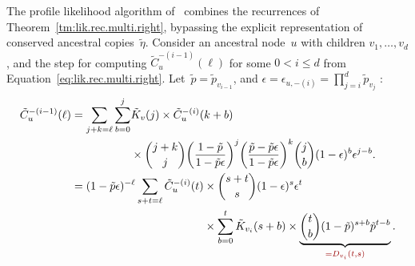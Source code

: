 \documentclass{elsarticle}
\newcommand{\CB}[1]{\textcolor{webbrown}{#1}}
\newcommand{\nlik}{C}
\newcommand{\slik}{K}
\newcommand{\nx}{u}
\newcommand{\ny}{v}
\begin{document}
The profile likelihood algorithm of~\cite{phylobd.archaea,Count}  
combines the recurrences
of Theorem~\ref{tm:lik.rec.multi.right}, 
bypassing the explicit representation 
of conserved ancestral copies~$\tilde{\eta}$. 
Consider an ancestral node~$\nx$ with children $\ny_1,\dotsc, \ny_d$, 
and the step for computing $\tilde{\nlik}^{-(i-1)}_{\nx}(\ell)$ 
for some $0<i\le d$
from Equation~\eqref{eq:lik.rec.multi.right}.
Let~$\tilde{p}=\tilde{p}_{\ny_{i-1}}$, and 
$\epsilon=\epsilon_{\nx,-(i)}=\prod_{j=i}^{d} \tilde{p}_{\ny_j}$ : 
\begin{align*}
\tilde{\nlik}^{-(i-1)}_{\nx}(\ell)
& = \begin{aligned}[t]
	\sum_{j+k=\ell}\sum_{b=0}^{j} 
	& 
	\tilde{\slik}_{\ny}(j) \times \tilde{C}^{-(i)}_{\nx}(k+b) \\
	& \times 
	\binom{j+k}{j}
	\biggl(\frac{1-\tilde{p}}{1-\tilde{p}\epsilon}\biggr)^{j}
	\biggl(\frac{\tilde{p}-\tilde{p}\epsilon}{1-\tilde{p}\epsilon}\biggr)^{k}
	\binom{j}{b}(1-\epsilon)^b\epsilon^{j-b}.
	\end{aligned}
\\ & = \begin{aligned}[t]
	(1-\tilde{p}\epsilon)^{-\ell}
	\sum_{s+t=\ell} \tilde{C}^{-(i)}_{\nx}(t)
	& \times \binom{s+t}{s}(1-\epsilon)^s\epsilon^t \\
	& \times \sum_{b=0}^t \tilde{\slik}_{\ny_i}(s+b)\times  
 \underbrace{\binom{t}{b} (1-\tilde{p})^{s+b}\tilde{p}^{t-b}}_{\CB{=D_{\ny_i}(t,s)}}. 
 \end{aligned}
\end{align*}
\end{document}
